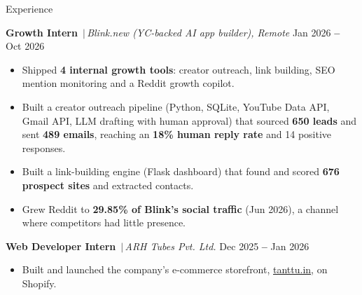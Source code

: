 \documentclass{resume}
\newcommand{\daterange}{\textbf{--}}
\newcommand{\sep}{\,$|$\,}
\begin{document}
\begin{rSection}{Experience}

\textbf{Growth Intern} \sep \textit{Blink.new (YC-backed AI app builder), Remote} \hfill {\small Jan 2026 \daterange{} Oct 2026}
\begin{itemize}
  \itemsep -2pt
  \item Shipped \textbf{4 internal growth tools}: creator outreach, link building, SEO mention monitoring and a Reddit growth copilot.
  \item Built a creator outreach pipeline (Python, SQLite, YouTube Data API, Gmail API, LLM drafting with human approval) that sourced \textbf{650 leads} and sent \textbf{489 emails}, reaching an \textbf{18\% human reply rate} and 14 positive responses.
  \item Built a link-building engine (Flask dashboard) that found and scored \textbf{676 prospect sites} and extracted contacts.
  \item Grew Reddit to \textbf{29.85\% of Blink's social traffic} (Jun 2026), a channel where competitors had little presence.
\end{itemize}

\vspace{1mm}
\textbf{Web Developer Intern} \sep \textit{ARH Tubes Pvt. Ltd.} \hfill {\small Dec 2025 \daterange{} Jan 2026}
\begin{itemize}
  \itemsep -2pt
  \item Built and launched the company's e-commerce storefront, \href{https://tanttu.in}{tanttu.in}, on Shopify.
\end{itemize}

\end{rSection}
\end{document}
